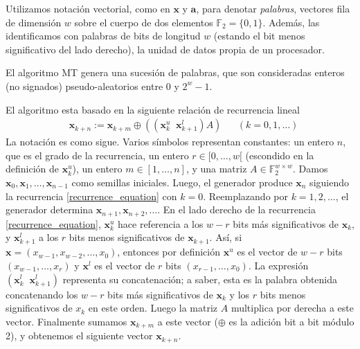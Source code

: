 \documentclass{article}
\DeclareMathOperator{\concat}{||}
\newcommand{\ffield}{\mathbb{F}}
\begin{document}
Utilizamos notación vectorial, como en $\mathbf{x}$ y $\mathbf{a}$, para denotar \emph{palabras}, vectores fila de dimensión $w$ sobre el cuerpo de dos elementos $\ffield_2 = \{0, 1\}$.
Además, las identificamos con palabras de bits de longitud $w$ (estando el bit menos significativo del lado derecho), la unidad de datos propia de un procesador.

El algoritmo MT genera una sucesión de palabras, que son consideradas enteros (no signados) pseudo-aleatorios entre $0$ y $2^w - 1$.

El algoritmo esta basado en la siguiente relación de recurrencia lineal
\begin{align} \label{recurrence_equation}
    & \mathbf{x}_{k + n} := 
        \mathbf{x}_{k + m} \oplus ((\mathbf{x}_k^u \concat \mathbf{x}_{k + 1}^l) A )
    && (k = 0, 1, \dots)
\end{align}
La notación es como sigue.
Varios símbolos representan constantes:
un entero $n$, que es el grado de la recurrencia,
un entero $r \in [0, \dots, w[$ (escondido en la definición de $\mathbf{x}_k^u$),
un entero $m \in [1, \dots, n]$,
y una matriz $A \in \ffield_2^{w \times w}$.
Damos $\mathbf{x}_0, \mathbf{x}_1, \dots, \mathbf{x}_{n - 1}$ como semillas iniciales.
Luego, el generador produce $\mathbf{x}_n$ siguiendo la recurrencia \ref{recurrence_equation} con $k = 0$.
Reemplazando por $k = 1, 2, \dots$, el generador determina $\mathbf{x}_{n + 1}, \mathbf{x}_{n + 2}, \dots$.
En el lado derecho de la recurrencia \ref{recurrence_equation}, $\mathbf{x}_k^u$ hace referencia a los $w - r$ bits más significativos de $\mathbf{x}_k$, y $\mathbf{x}_{k + 1}^l$ a los $r$ bits menos significativos de $\mathbf{x}_{k + 1}$.
Así, si $\mathbf{x} = (x_{w - 1}, x_{w - 2}, \dots, x_0)$, entonces por definición $\mathbf{x}^u$ es el vector de $w - r$ bits $(x_{w - 1}, \dots, x_r)$ y $\mathbf{x}^l$ es el vector de $r$ bits $(x_{r - 1}, \dots, x_0)$.
La expresión $(\mathbf{x}_k^l \concat \mathbf{x}_{k + 1}^l)$ representa su concatenación;
a saber, esta es la palabra obtenida concatenando los $w - r$ bits más significativos de $\mathbf{x}_k$ y los $r$ bits menos significativos de $x_k$ en este orden.
Luego la matriz $A$ multiplica por derecha a este vector.
Finalmente sumamos $\mathbf{x}_{k + m}$ a este vector ($\oplus$ es la adición bit a bit módulo 2), y obtenemos el siguiente vector $\mathbf{x}_{k + n}$.
\end{document}
